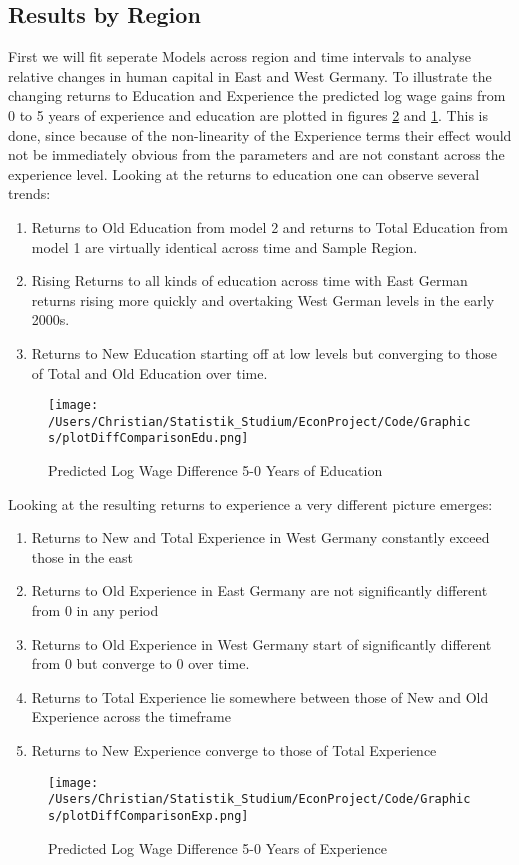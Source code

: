 \documentclass{article}
\begin{document}
\subsection{Results by Region}
First we will fit seperate Models across region and time intervals to analyse relative changes in human capital in East and West Germany. 
To illustrate the changing returns to Education and Experience the predicted log wage gains from 0 to 5 years of experience and education are plotted in figures \ref{fig:DiffComparisonExp} and \ref{fig:DiffComparisonEdu}.  This is done, since because of the non-linearity of the Experience terms their effect would not be immediately obvious from the parameters and are not constant across the experience level. Looking at the returns to education one can observe several trends:
\begin{enumerate}
	\item Returns to Old Education from model 2 and returns to Total Education from model 1 are virtually identical across time and Sample Region.
	\item Rising Returns to all kinds of education across time with East German returns rising more quickly and overtaking West German levels in the early 2000s.
	\item Returns to New Education starting off at low levels but converging to those of Total and Old Education over time.	 
\end{enumerate}

\begin{figure}[!h]
    \centering
    \texttt{[image: /Users/Christian/Statistik\_Studium/EconProject/Code/Graphics/plotDiffComparisonEdu.png]}
    \caption{Predicted Log Wage Difference 5-0 Years of Education}
    \label{fig:DiffComparisonEdu}
\end{figure}

Looking at the resulting returns to experience a very different picture emerges:
\begin{enumerate}
	\item Returns to New and Total Experience in West Germany constantly exceed those in the east
	\item Returns to Old Experience in East Germany are not significantly different from 0 in any period
	\item Returns to Old Experience in West Germany start of significantly different from 0 but converge to 0 over time.
	\item Returns to Total Experience lie somewhere between those of New and Old Experience across the timeframe
	\item Returns to New Experience converge to those of Total Experience
\end{enumerate}
\begin{figure}[!h]
    \centering
    \texttt{[image: /Users/Christian/Statistik\_Studium/EconProject/Code/Graphics/plotDiffComparisonExp.png]}
    \caption{Predicted Log Wage Difference 5-0 Years of Experience}
    \label{fig:DiffComparisonExp}
\end{figure}
\end{document}
